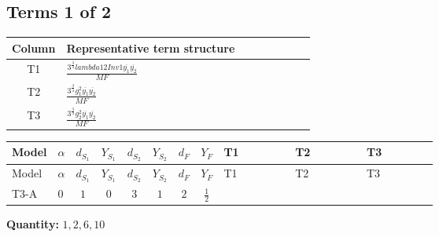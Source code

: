 \documentclass[8pt]{article}
\begin{document}
\begin{landscape}
\subsection*{Terms 1 of 2}
\begin{center}
\begin{tabular}{@{}c >{\raggedright\arraybackslash}p{0.82\linewidth}@{}}
\toprule
Column & Representative term structure \\
\midrule
T1 & \(\displaystyle \frac{3^{\frac{3}{4}} lambda12Inv1 \overline{y_{1}} \overline{y_{2}}}{MF}\) \\
\midrule
T2 & \(\displaystyle \frac{3^{\frac{3}{4}} g_{1}^{2} \overline{y_{1}} \overline{y_{2}}}{MF}\) \\
\midrule
T3 & \(\displaystyle \frac{3^{\frac{3}{4}} g_{2}^{2} \overline{y_{1}} \overline{y_{2}}}{MF}\) \\
\midrule
\bottomrule
\end{tabular}
\end{center}
\smallskip
\tiny
\begin{longtable}{@{}llcccccc >{\raggedright\arraybackslash}p{0.21\linewidth} >{\raggedright\arraybackslash}p{0.21\linewidth} >{\raggedright\arraybackslash}p{0.21\linewidth}@{}}
\toprule
Model & $\alpha$ & $d_{S_1}$ & $Y_{S_1}$ & $d_{S_2}$ & $Y_{S_2}$ & $d_F$ & $Y_F$ & T1 & T2 & T3 \\
\midrule
\endfirsthead
\toprule
Model & $\alpha$ & $d_{S_1}$ & $Y_{S_1}$ & $d_{S_2}$ & $Y_{S_2}$ & $d_F$ & $Y_F$ & T1 & T2 & T3 \\
\midrule
\endhead
T3-A & $0$ & $1$ & $0$ & $3$ & $1$ & $2$ & $\frac{1}{2}$ & \scriptsize\adjustbox{max width=\linewidth}{$\begin{gathered} \frac{3^{\frac{3}{4}} lambda12Inv1 \overline{y_{1}} \overline{y_{2}}}{6 MF}\end{gathered}$} & \scriptsize\adjustbox{max width=\linewidth}{$\begin{gathered} \frac{3^{\frac{3}{4}} g_{1}^{2} \overline{y_{1}} \overline{y_{2}}}{8 MF}\end{gathered}$} & \scriptsize\adjustbox{max width=\linewidth}{$\begin{gathered} \frac{25 \cdot 3^{\frac{3}{4}} g_{2}^{2} \overline{y_{1}} \overline{y_{2}}}{24 MF}\end{gathered}$} \\
\midrule
\bottomrule
\end{longtable}
\clearpage
\noindent\textbf{Quantity: }$\mathrm{1,2,6,10}$\par\smallskip

\end{landscape}
\end{document}
